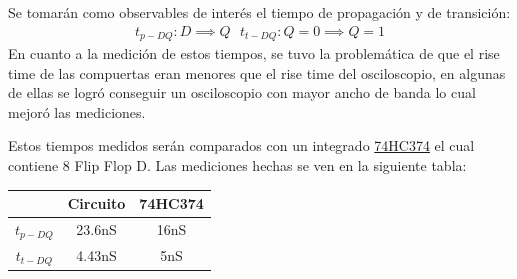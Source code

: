 Se tomarán como observables  de interés el tiempo de propagación y de transición:
\begin{align} t_{p-DQ}: D \implies Q \ \ \ t_{t-DQ}: Q=0 \implies Q = 1 \end{align} 
En cuanto a la medición de estos tiempos, se tuvo la problemática de que el rise time de las compuertas eran menores que el rise time del osciloscopio, en algunas de ellas se logró conseguir un osciloscopio con mayor ancho de banda lo cual mejoró las mediciones.

Estos tiempos medidos serán comparados con un integrado \href{https://pdf1.alldatasheet.com/datasheet-pdf/view/15593/PHILIPS/74HC374.html}{74HC374} el cual contiene 8 Flip Flop D.
Las mediciones hechas se ven en la siguiente tabla:
\begin{table}[H]
\centering
\begin{tabular}{ccc}
\textit{}                               & \textbf{Circuito}         & \textbf{74HC374}     \\ \hline
\textbf{$t_{p-DQ}$}                     & 23.6nS                    & 16nS                 \\
\textbf{$t_{t-DQ}$}                     & 4.43nS                    & 5nS                  \\
\end{tabular}
\end{table}

